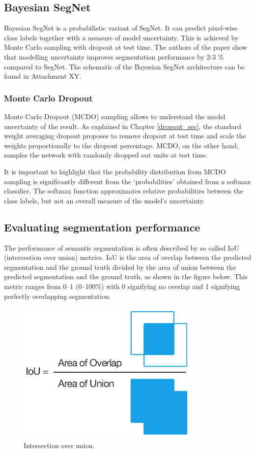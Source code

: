 \subsection{Bayesian SegNet}

Bayesian SegNet is a probabilistic variant of SegNet. It can predict pixel-wise class labels together with a measure of model uncertainty.  This is achieved by Monte Carlo sampling with dropout at test time. The authors of the paper show that modelling uncertainty improves segmentation performance by 2-3 \% compared to SegNet. The schematic of the Bayesian SegNet architecture can be found in Attachment XY. \cite{bayesian}

\subsubsection{Monte Carlo Dropout}

Monte Carlo Dropout (MCDO) sampling allows to understand the model uncertainty of the result. As explained in Chapter \ref{dropout_sec}, the standard weight averaging dropout proposes to remove dropout at test time and scale the weights proportionally to the dropout percentage. MCDO, on the other hand, samples the network with randomly dropped out units at test time. \cite{bayesian}

It is important to highlight that the probability distribution from MCDO sampling is significantly different from the ‘probabilities’ obtained from a softmax classifier. The softmax function approximates relative probabilities between the class labels, but not an overall measure of the model’s uncertainty. \cite{bayesian}

\subsection{Evaluating segmentation performance}

The performance of semantic segmentation is often described by so called IoU (intercestion over union) metrics. IoU is the area of overlap between the predicted segmentation and the ground truth divided by the area of union between the predicted segmentation and the ground truth, as shown in the figure below. This metric ranges from 0–1 (0–100\%) with 0 signifying no overlap and 1 signifying perfectly overlapping segmentation.

\vspace{4mm}
\begin{figure}[h]
	\begin{center}
		\includegraphics*[width=9cm, keepaspectratio]{obr/iou.png}
	\end{center}
	\vspace{4mm}
	\caption{Intersection over union. \cite{iou}} 
	\label{iou}
\end{figure}




